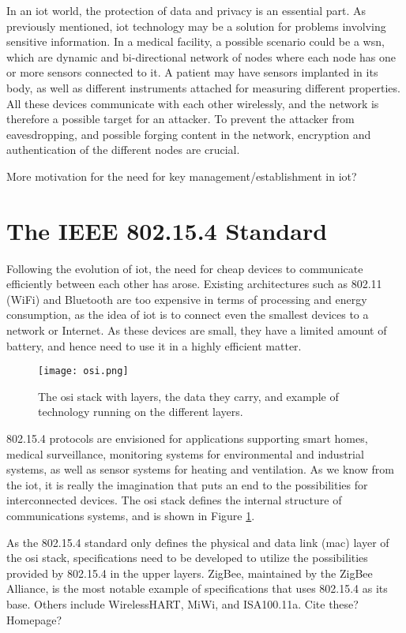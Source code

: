 In an \gls{iot} world, the protection of data and privacy is an essential part. As previously mentioned, \gls{iot} technology may be a solution for problems involving sensitive information. In a medical facility, a possible scenario could be a \gls{wsn}, which are dynamic and bi-directional network of nodes where each node has one or more sensors connected to it. A patient may have sensors implanted in its body, as well as different instruments attached for measuring different properties. All these devices communicate with each other wirelessly, and the network is therefore a possible target for an attacker. To prevent the attacker from eavesdropping, and possible forging content in the network, encryption and authentication of the different nodes are crucial.



More motivation for the need for key management/establishment in \gls{iot}?



\section{The IEEE 802.15.4 Standard}

Following the evolution of \gls{iot}, the need for cheap devices to communicate efficiently between each other has arose. Existing architectures such as 802.11 (WiFi) and Bluetooth are too expensive in terms of processing and energy consumption, as the idea of \gls{iot} is to connect even the smallest devices to a network or Internet. As these devices are small, they have a limited amount of battery, and hence need to use it in a highly efficient matter.

\begin{figure}[h]
	\centering
	\texttt{[image: osi.png]}
	\caption{The \gls{osi} stack with layers, the data they carry, and example of technology running on the different layers.}
	\label{fig:osi}
\end{figure}

802.15.4 protocols are envisioned for applications supporting smart homes, medical surveillance, monitoring systems for environmental and industrial systems, as well as sensor systems for heating and ventilation. As we know from the \gls{iot}, it is really the imagination that puts an end to the possibilities for interconnected devices. The \gls{osi} stack defines the internal structure of communications systems, and is shown in Figure \ref{fig:osi}.

As the 802.15.4 standard only defines the physical and data link (\gls{mac}) layer of the \gls{osi} stack, specifications need to be developed to utilize the possibilities provided by 802.15.4 in the upper layers. ZigBee, maintained by the ZigBee Alliance, is the most notable example of specifications that uses 802.15.4 as its base. Others include WirelessHART, MiWi, and ISA100.11a. Cite these? Homepage?

